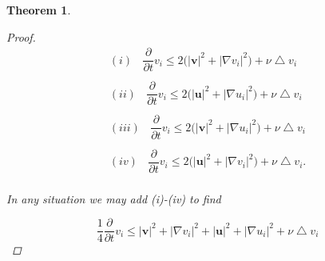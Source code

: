 \documentclass[amsmath,12pt,a4paper]{amsart}
\newtheorem{theorem}{Theorem}
\begin{document}
\begin{theorem}
\begin{proof}
\begin{equation}\label{Eq24}
\begin{split}
(i)~~~~\dfrac{\partial}{\partial t} v_i\le 2 \biggl(|\textbf{v}|^2 + |\nabla v_i|^2  \biggr)+ \nu \bigtriangleup v_i \\
\\
(ii)~~~~\dfrac{\partial}{\partial t} v_i\le 2 \biggl(|\textbf{u}|^2 + |\nabla u_i|^2  \biggr)+ \nu \bigtriangleup v_i \\
\\
(iii)~~~~\dfrac{\partial}{\partial t} v_i\le 2 \biggl(|\textbf{v}|^2 + |\nabla u_i|^2  \biggr)+ \nu \bigtriangleup v_i \\
\\
(iv)~~~~\dfrac{\partial}{\partial t} v_i\le 2 \biggl(|\textbf{u}|^2 + |\nabla v_i|^2  \biggr)+ \nu \bigtriangleup v_i. \\
\end{split}
\end{equation}

In any situation we may add (i)-(iv) to find

\begin{equation}\label{Eq25}
\dfrac{1}{4}\dfrac{\partial}{\partial t} v_i \le |\textbf{v}|^2+ |\nabla v_i |^2 + |\textbf{u}|^2+  |\nabla u_i|^2 + \nu \bigtriangleup v_i
\end{equation}
 

\end{proof}
\end{theorem}
\end{document}
